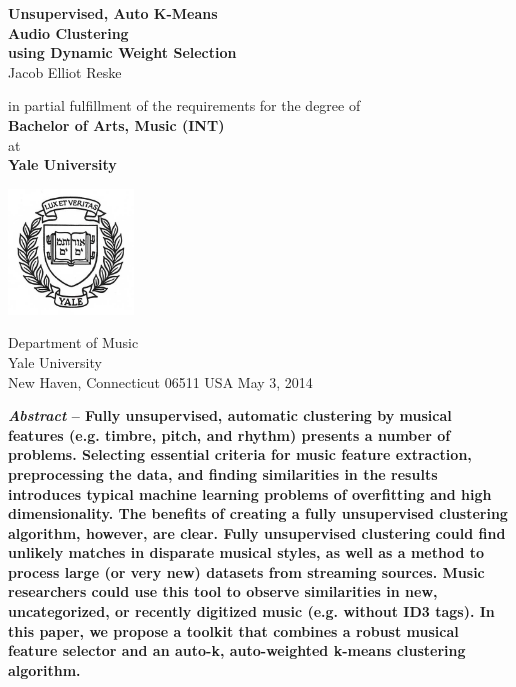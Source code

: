 \documentclass[12pt,twocolumn,titlepage]{article}
\begin{document}
\begin{titlepage}
\thispagestyle{empty}

    \begin{center}
        
        \Huge
        \textbf{Unsupervised, Auto K-Means \\Audio Clustering\\using Dynamic Weight Selection} \\
        \vspace{0.5cm}
        \Large
        Jacob Elliot Reske
        \Large

        \vspace{1.5cm}
        
        \large
        in partial fulfillment of the requirements for the degree of\\
        \textbf{Bachelor of Arts, Music (INT)}\\
        at\\
        \textbf{Yale University}
        \large
        \vspace{5.5cm}
        
        \includegraphics[width=0.25\textwidth]{yale}
        
        \Large
        \small
        Department of Music\\
        Yale University\\
        New Haven, Connecticut 06511 USA
        May 3, 2014
        \small
    \end{center}
\end{titlepage}


\textbf{\emph{Abstract} -- Fully unsupervised, automatic clustering by musical features (e.g. timbre, pitch, and rhythm) presents a number of problems. Selecting essential criteria for music feature extraction, preprocessing the data, and finding similarities in the results introduces typical machine learning problems of overfitting and high dimensionality. The benefits of creating a fully unsupervised clustering algorithm, however, are clear. Fully unsupervised clustering could find unlikely matches in disparate musical styles, as well as a method to process large (or very new) datasets from streaming sources. Music researchers could use this tool to observe similarities in new, uncategorized, or recently digitized music (e.g. without ID3 tags). In this paper, we propose a toolkit that combines a robust musical feature selector and an auto-k, auto-weighted k-means clustering algorithm.}
\end{document}
